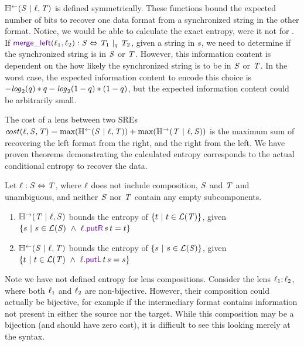 \documentclass[acmsmall,screen,anonymous]{acmart}
\begin{document}
$\mathbb{H}^\leftarrow(\mathit{S} ~|~ \mathit{\ell}, \mathit{T})$ is defined symmetrically. These
functions bound the expected number of bits to recover one data format from a
synchronized string in the other format. Notice, we would be able to calculate
the exact entropy, were it not for \MergeL. If $\MergeLOf{\Lens_1}{\Lens_2}
\OfType \Regex \Leftrightarrow
\PRegexOr{\RegexAlt_1}{\RegexAlt_2}{\ProbabilityAlt}$, given a string in $s$, we
need to determine if the synchronized string is in $\mathit{S}$ or $\mathit{T}$.
However, this information content is dependent on the how likely the
synchronized string is to be in $\mathit{S}$ or $\mathit{T}$. In the worst case, the
expected information content to encode this choice is
$-\mathit{log}_2(q)*q -\mathit{log}_2(1 -
q)*(1-q)$, but the expected information content
could be arbitrarily small.

The cost of a lens between two SREs $cost(\mathit{\ell}, \mathit{S}, \mathit{T}) =
\text{max}(\mathbb{H}^\leftarrow(\mathit{S} ~|~ \mathit{\ell}, \mathit{T})) +
\text{max}(\mathbb{H}^\rightarrow(\mathit{T} ~|~ \mathit{\ell}, \mathit{S}))$ is the maximum sum of
recovering the left format from the right, and the right from the left. We have
proven theorems demonstrating the calculated entropy corresponds to the actual
conditional entropy to recover the data.

\begin{theorem}
  Let $\mathit{\ell} : \mathit{S} \Leftrightarrow \mathit{T}$, where $\mathit{\ell}$ does not
  include composition, $\mathit{S}$ and $\mathit{T}$ and unambiguous, and neither
  $\mathit{S}$ nor $\mathit{T}$ contain any empty subcomponents.
  \begin{enumerate}
  \item $\mathbb{H}^\rightarrow(\mathit{T} ~|~ \mathit{\ell}, \mathit{S})$ bounds the entropy of
    $\{t ~|~ t \in \mathcal{L}(\mathit{T})\}$, given $\SetOf{s
      \SuchThat s \in \LanguageOf{\Regex} \BooleanAnd \Lens.\PutROf{s}{t} = t}$
  \item $\mathbb{H}^\leftarrow(\mathit{S} ~|~ \mathit{\ell}, \mathit{T})$ bounds the entropy of
    $\{s ~|~ s \in \mathcal{L}(\mathit{S})\}$, given $\SetOf{t \SuchThat t
      \in \LanguageOf{\RegexAlt} \BooleanAnd \Lens.\PutLOf{t}{s} = s}$
  \end{enumerate}
\end{theorem}

Note we have not defined entropy for lens compositions. Consider the lens
$\mathit{\ell}_1 ; \mathit{\ell}_2$, where both $\mathit{\ell}_1$ and $\mathit{\ell}_2$ are non-bijective.
However, their composition could actually be bijective, for example if the
intermediary format contains information not present in either the source nor
the target. While this composition may be a bijection (and should have zero
cost), it is difficult to see this looking merely at the syntax.
\end{document}
